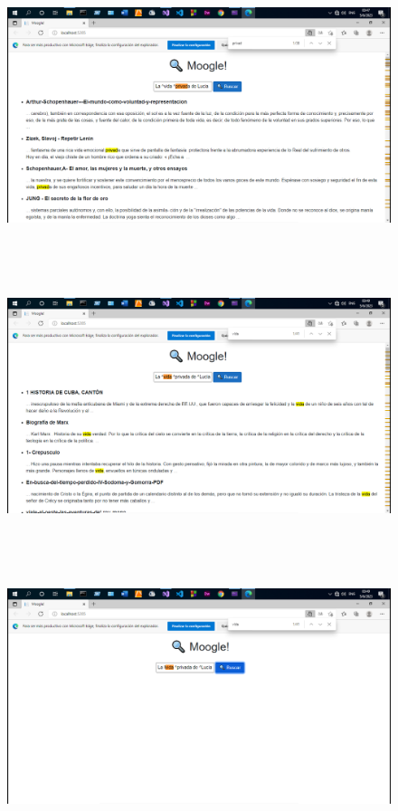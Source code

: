 \documentclass[a4paper,12pt]{report}
\begin{document}
\medskip

\begin{figure}[h]
    \includegraphics*[width=15cm, height=8cm]{fotos/10 - Resultados (3).png}
\end{figure}

\newpage

\begin{figure}[h]
    \includegraphics*[width=15cm, height=8cm]{fotos/11 - Resultados (4).png}
\end{figure}

\medskip

\begin{figure}[h]
    \includegraphics*[width=15cm, height=8cm]{fotos/12 - Resultados (5).png}
\end{figure}
\end{document}
